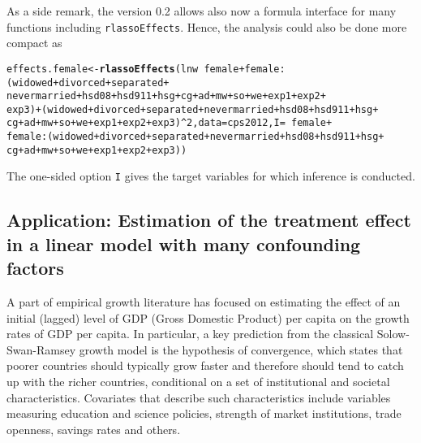 \documentclass{amsart}\usepackage[]{graphicx}\usepackage[]{color}
\makeatletter
\newcommand{\hlnum}[1]{\textcolor[rgb]{0.686,0.059,0.569}{#1}}%
\newcommand{\hlopt}[1]{\textcolor[rgb]{0,0,0}{#1}}%
\newcommand{\hlstd}[1]{\textcolor[rgb]{0.345,0.345,0.345}{#1}}%
\newcommand{\hlkwb}[1]{\textcolor[rgb]{0.69,0.353,0.396}{#1}}%
\newcommand{\hlkwc}[1]{\textcolor[rgb]{0.333,0.667,0.333}{#1}}%
\newcommand{\hlkwd}[1]{\textcolor[rgb]{0.737,0.353,0.396}{\textbf{#1}}}%
\newenvironment{kframe}{%
 \def\at@end@of@kframe{}%
 \ifinner\ifhmode%
  \def\at@end@of@kframe{\end{minipage}}%
  \begin{minipage}{\columnwidth}%
 \fi\fi%
 \def\FrameCommand##1{\hskip\@totalleftmargin \hskip-\fboxsep
 \colorbox{shadecolor}{##1}\hskip-\fboxsep
     \hskip-\linewidth \hskip-\@totalleftmargin \hskip\columnwidth}%
 \MakeFramed {\advance\hsize-\width
   \@totalleftmargin\z@ \linewidth\hsize
   \@setminipage}}%
 {\par\unskip\endMakeFramed%
 \at@end@of@kframe}
\newenvironment{knitrout}{}{} %
\makeatother
\begin{document}
As a side remark, the version 0.2 allows also now a formula interface for many functions including \texttt{rlassoEffects}. Hence, the analysis could also be done more compact as
\begin{knitrout}
\color{fgcolor}\begin{kframe}
\begin{alltt}
\hlstd{effects.female} \hlkwb{<-} \hlkwd{rlassoEffects}\hlstd{(lnw} \hlopt{~} \hlstd{female} \hlopt{+} \hlstd{female}\hlopt{:}\hlstd{(widowed} \hlopt{+} \hlstd{divorced} \hlopt{+} \hlstd{separated} \hlopt{+}
    \hlstd{nevermarried} \hlopt{+} \hlstd{hsd08} \hlopt{+} \hlstd{hsd911} \hlopt{+} \hlstd{hsg} \hlopt{+} \hlstd{cg} \hlopt{+} \hlstd{ad} \hlopt{+} \hlstd{mw} \hlopt{+} \hlstd{so} \hlopt{+} \hlstd{we} \hlopt{+} \hlstd{exp1} \hlopt{+} \hlstd{exp2} \hlopt{+}
    \hlstd{exp3)} \hlopt{+} \hlstd{(widowed} \hlopt{+} \hlstd{divorced} \hlopt{+} \hlstd{separated} \hlopt{+} \hlstd{nevermarried} \hlopt{+} \hlstd{hsd08} \hlopt{+} \hlstd{hsd911} \hlopt{+} \hlstd{hsg} \hlopt{+}
    \hlstd{cg} \hlopt{+} \hlstd{ad} \hlopt{+} \hlstd{mw} \hlopt{+} \hlstd{so} \hlopt{+} \hlstd{we} \hlopt{+} \hlstd{exp1} \hlopt{+} \hlstd{exp2} \hlopt{+} \hlstd{exp3)}\hlopt{^}\hlnum{2}\hlstd{,} \hlkwc{data} \hlstd{= cps2012,} \hlkwc{I} \hlstd{=} \hlopt{~}\hlstd{female} \hlopt{+}
    \hlstd{female}\hlopt{:}\hlstd{(widowed} \hlopt{+} \hlstd{divorced} \hlopt{+} \hlstd{separated} \hlopt{+} \hlstd{nevermarried} \hlopt{+} \hlstd{hsd08} \hlopt{+} \hlstd{hsd911} \hlopt{+} \hlstd{hsg} \hlopt{+}
        \hlstd{cg} \hlopt{+} \hlstd{ad} \hlopt{+} \hlstd{mw} \hlopt{+} \hlstd{so} \hlopt{+} \hlstd{we} \hlopt{+} \hlstd{exp1} \hlopt{+} \hlstd{exp2} \hlopt{+} \hlstd{exp3))}
\end{alltt}
\end{kframe}
\end{knitrout}
The one-sided option \texttt{I} gives the target variables for which inference is conducted.

\subsection{Application: Estimation of the treatment effect in a linear model with many confounding factors}

A part of empirical growth literature has focused on estimating the effect of an initial (lagged) level of GDP (Gross Domestic Product) per capita on the growth rates of GDP per capita. In particular, a key prediction from the classical Solow-Swan-Ramsey growth model is the hypothesis of convergence, which states that poorer countries should typically grow faster and therefore should tend to catch up with the richer countries, conditional on a set of institutional and societal characteristics. Covariates that describe such characteristics  include variables measuring education and science policies, strength of market institutions, trade openness, savings rates and others.
\end{document}
